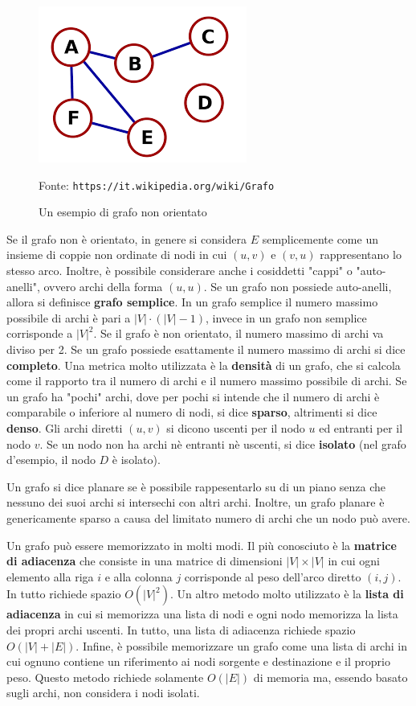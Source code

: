 \documentclass[12pt,a4paper]{book}
\newcommand{\source}[1]{\caption*{Fonte: {\small\texttt{#1}}} }
\begin{document}
	\begin{figure}
		\centering
		\includegraphics[width=0.5\linewidth]{grafo-esempio}
		\caption{Un esempio di grafo non orientato}
		\source{https://it.wikipedia.org/wiki/Grafo}
		\label{fig:grafo-esempio}
	\end{figure}

	Se il grafo non è orientato, in genere si considera $E$ semplicemente come un insieme di coppie non ordinate di nodi in cui $(u,v)$ e $(v,u)$ rappresentano lo stesso arco.
	Inoltre, è possibile considerare anche i cosiddetti "cappi" o "auto-anelli", ovvero archi della forma $(u,u)$. Se un grafo non possiede auto-anelli, allora si definisce \textbf{grafo semplice}. In un grafo semplice il numero massimo possibile di archi è pari a $|V|\cdot (|V|-1)$, invece in un grafo non semplice corrisponde a $|V|^2$. Se il grafo è non orientato, il numero massimo di archi va diviso per 2. Se un grafo possiede esattamente il numero massimo di archi si dice \textbf{completo}.
	Una metrica molto utilizzata è la \textbf{densità} di un grafo, che si calcola come il rapporto tra il numero di archi e il numero massimo possibile di archi. Se un grafo ha "pochi" archi, dove per pochi si intende che il numero di archi è comparabile o inferiore al numero di nodi, si dice \textbf{sparso}, altrimenti si dice \textbf{denso}. Gli archi diretti $(u,v)$ si dicono uscenti per il nodo $u$ ed entranti per il nodo $v$. Se un nodo non ha archi nè entranti nè uscenti, si dice \textbf{isolato} (nel grafo d'esempio, il nodo $D$ è isolato).
	
	Un grafo si dice planare se è possibile rappesentarlo su di un piano senza che nessuno dei suoi archi si intersechi con altri archi. Inoltre, un grafo planare è genericamente sparso a causa del limitato numero di archi che un nodo può avere.
	
	Un grafo può essere memorizzato in molti modi. Il più conosciuto è la \textbf{matrice di adiacenza} che consiste in una matrice di dimensioni $|V|\times |V|$ in cui ogni elemento alla riga $i$ e alla colonna $j$ corrisponde al peso dell'arco diretto $(i,j)$. In tutto richiede spazio $O(|V|^2)$. Un altro metodo molto utilizzato è la \textbf{lista di adiacenza} in cui si memorizza una lista di nodi e ogni nodo memorizza la lista dei propri archi uscenti. In tutto, una lista di adiacenza richiede spazio $O(|V|+|E|)$. Infine, è possibile memorizzare un grafo come una lista di archi in cui ognuno contiene un riferimento ai nodi sorgente e destinazione e il proprio peso. Questo metodo richiede solamente $O(|E|)$ di memoria ma, essendo basato sugli archi, non considera i nodi isolati.
	
\end{document}
